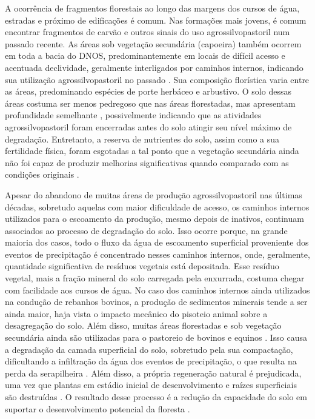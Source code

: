 A ocorrência de fragmentos florestais ao longo das margens dos cursos de água, estradas e próximo de 
edificações é comum. Nas formações mais jovens, é comum encontrar fragmentos de carvão e outros sinais do uso 
agrossilvopastoril num passado recente. As áreas sob vegetação secundária (capoeira) também ocorrem em toda a 
bacia do DNOS, predominantemente em locais de difícil acesso e acentuada declividade, geralmente interligados 
por caminhos internos, indicando sua utilização agrossilvopastoril no passado \cite{SamuelRosaEtAl2011a}. Sua 
composição florística varia entre as áreas, predominando espécies de porte herbáceo e arbustivo. O solo dessas 
áreas costuma ser menos pedregoso que nas áreas florestadas, mas apresentam profundidade semelhante 
\cite{SamuelRosaEtAl2011a}, possivelmente indicando que as atividades agrossilvopastoril foram encerradas 
antes do solo atingir seu nível máximo de degradação. Entretanto, a reserva de nutrientes do solo, assim como 
a sua fertilidade física, foram esgotadas a tal ponto que a vegetação secundária ainda não foi capaz de 
produzir melhorias significativas quando comparado com as condições originais \cite{Menezes2008, 
Zalamena2008}.

Apesar do abandono de muitas áreas de produção agrossilvopastoril nas últimas décadas, sobretudo aquelas com 
maior dificuldade de acesso, os caminhos internos utilizados para o escoamento da produção, mesmo depois de 
inativos, continuam associados ao processo de degradação do solo. Isso ocorre porque, na grande maioria dos 
casos, todo o fluxo da água de escoamento superficial proveniente dos eventos de precipitação é concentrado 
nesses caminhos internos, onde, geralmente, quantidade significativa de resíduos vegetais está depositada. 
Esse resíduo vegetal, mais a fração mineral do solo carregada pela enxurrada, costuma chegar com facilidade 
aos cursos de água. No caso dos caminhos internos ainda utilizados na condução de rebanhos bovinos, a produção 
de sedimentos minerais tende a ser ainda maior, haja vista o impacto mecânico do pisoteio animal sobre a 
desagregação do solo. Além disso, muitas áreas florestadas e sob vegetação secundária ainda são utilizadas 
para o pastoreio de bovinos e equinos \cite{SamuelRosaEtAl2011a}. Isso causa a degradação da camada 
superficial do solo, sobretudo pela sua compactação, dificultando a infiltração da água dos eventos de 
precipitação, o que resulta na perda da serapilheira \cite{ScheneiderEtAl1978}. Além disso, a própria 
regeneração natural é prejudicada, uma vez que plantas em estádio inicial de desenvolvimento e raízes 
superficiais são destruídas \cite{ScheneiderEtAl1978, HackEtAl2005}. O resultado desse processo é a redução da 
capacidade do solo em suportar o desenvolvimento potencial da floresta \cite{KonigEtAl2002}.

